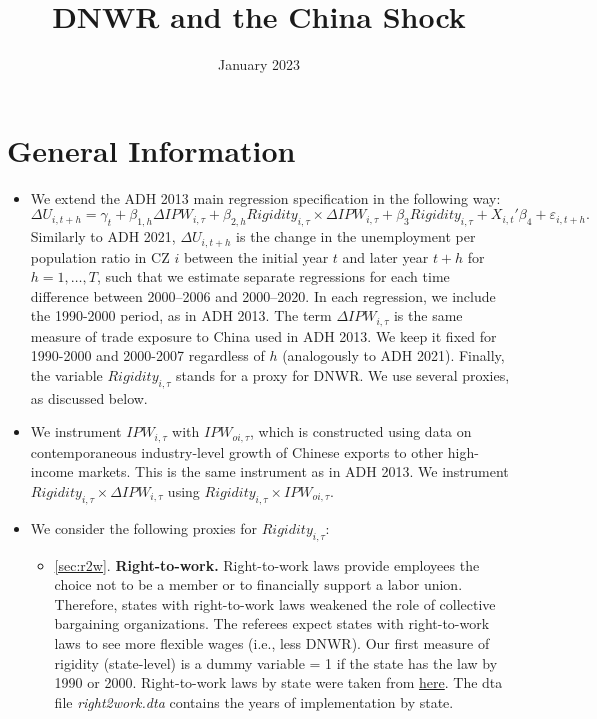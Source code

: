 \documentclass[12pt]{article}
\title{DNWR and the China Shock}
\date{January 2023}
\begin{document}
\maketitle

\section*{General Information}

\begin{itemize}
    \item We extend the ADH 2013 main regression specification in the following way:
\begin{equation}
    \Delta U_{i,t+h} = \gamma_t + \beta_{1,h} \Delta IPW_{i,\tau} + \beta_{2,h} Rigidity_{i,\tau} \times \Delta IPW_{i,\tau} + \beta_3 Rigidity_{i,\tau} +  X_{i,t}'\beta_4 + \varepsilon_{i,t+h}.\label{eq:ADHreg}
\end{equation}
Similarly to ADH 2021, $\Delta U_{i,t+h}$ is the change in the unemployment per population ratio in CZ $i$ between the initial year $t$ and later year $t + h$ for $h = 1, 
\dots, T$, such that we estimate separate regressions for each time difference between 2000–2006 and 2000–2020. In each regression, we include the 1990-2000 period, as in ADH 2013. The term $\Delta IPW_{i,\tau}$ is the same measure of trade exposure to China used in ADH 2013. We keep it fixed for 1990-2000 and 2000-2007 regardless of $h$ (analogously to ADH 2021). Finally, the variable $Rigidity_{i,\tau}$ stands for a proxy for DNWR. We use several proxies, as discussed below. 
\item We instrument $IPW_{i,\tau}$ with $IPW_{oi,\tau}$, which is constructed using data on contemporaneous industry-level growth of Chinese exports to other high-income markets. This is the same instrument as in ADH 2013. We instrument $Rigidity_{i,\tau} \times \Delta IPW_{i,\tau}$ using $Rigidity_{i,\tau} \times IPW_{oi,\tau}$.
\item We consider the following proxies for $Rigidity_{i,\tau}$:
\begin{itemize}
    \item \ref{sec:r2w}. \textbf{Right-to-work.} Right-to-work laws provide employees the choice not to be a member or to financially support a labor union. Therefore, states with right-to-work laws weakened the role of collective bargaining organizations. The referees expect states with right-to-work laws to see more flexible wages (i.e., less DNWR).  Our first measure of rigidity (state-level) is a dummy variable = 1 if the state has the law by 1990 or 2000. Right-to-work laws by  state were taken from \href{https://nrtwc.org/facts/state-right-to-work-timeline-2016/}{here}. The dta file \textit{right2work.dta} contains the years of implementation by state. 

\end{itemize}
\end{itemize}
\end{document}

